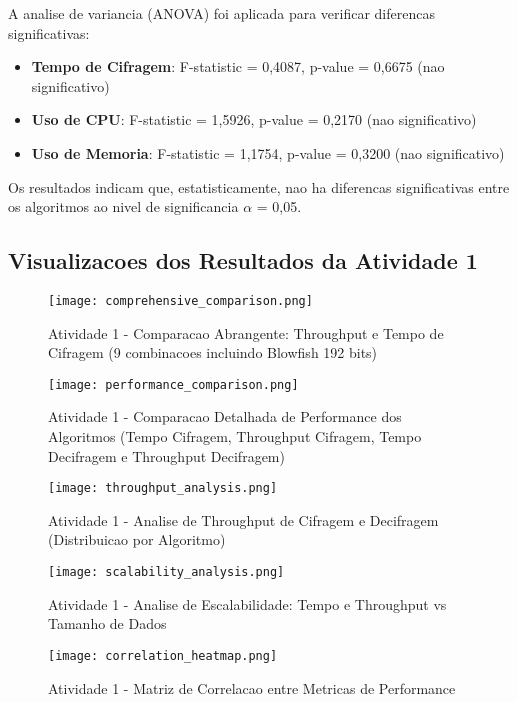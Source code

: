 \documentclass[12pt,a4paper,oneside]{article}
\begin{document}
A analise de variancia (ANOVA) foi aplicada para verificar diferencas significativas:

\begin{itemize}
    \item \textbf{Tempo de Cifragem}: F-statistic = 0,4087, p-value = 0,6675 (nao significativo)
    \item \textbf{Uso de CPU}: F-statistic = 1,5926, p-value = 0,2170 (nao significativo)
    \item \textbf{Uso de Memoria}: F-statistic = 1,1754, p-value = 0,3200 (nao significativo)
\end{itemize}

Os resultados indicam que, estatisticamente, nao ha diferencas significativas entre os algoritmos ao nivel de significancia $\alpha$ = 0,05.

\subsection{Visualizacoes dos Resultados da Atividade 1}

\begin{figure}[H]
\centering
\texttt{[image: comprehensive\_comparison.png]}
\caption{Atividade 1 - Comparacao Abrangente: Throughput e Tempo de Cifragem (9 combinacoes incluindo Blowfish 192 bits)}
\label{fig:comprehensive1}
\end{figure}

\begin{figure}[H]
\centering
\texttt{[image: performance\_comparison.png]}
\caption{Atividade 1 - Comparacao Detalhada de Performance dos Algoritmos (Tempo Cifragem, Throughput Cifragem, Tempo Decifragem e Throughput Decifragem)}
\label{fig:performance1}
\end{figure}

\begin{figure}[H]
\centering
\texttt{[image: throughput\_analysis.png]}
\caption{Atividade 1 - Analise de Throughput de Cifragem e Decifragem (Distribuicao por Algoritmo)}
\label{fig:throughput1}
\end{figure}

\begin{figure}[H]
\centering
\texttt{[image: scalability\_analysis.png]}
\caption{Atividade 1 - Analise de Escalabilidade: Tempo e Throughput vs Tamanho de Dados}
\label{fig:scalability1}
\end{figure}

\begin{figure}[H]
\centering
\texttt{[image: correlation\_heatmap.png]}
\caption{Atividade 1 - Matriz de Correlacao entre Metricas de Performance}
\label{fig:correlation1}
\end{figure}
\end{document}
